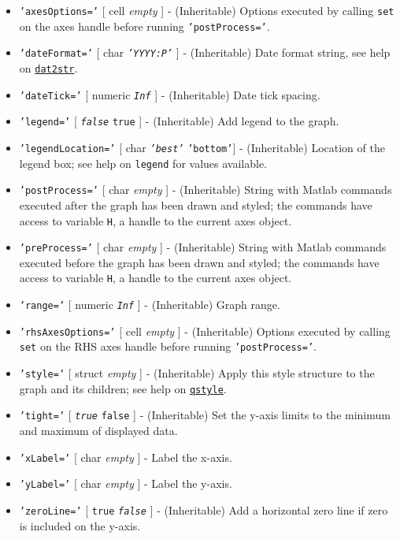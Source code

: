  \begin{itemize}
 \item
   \texttt{'axesOptions='} {[} cell \textbar{} \emph{empty} {]} -
   (Inheritable) Options executed by calling \texttt{set} on the axes
   handle before running \texttt{'postProcess='}.
 \item
   \texttt{'dateFormat='} {[} char \textbar{} \emph{\texttt{'YYYY:P'}}
   {]} - (Inheritable) Date format string, see help on
   \href{dates/dat2str}{\texttt{dat2str}}.
 \item
   \texttt{'dateTick='} {[} numeric \textbar{} \emph{\texttt{Inf}} {]} -
   (Inheritable) Date tick spacing.
 \item
   \texttt{'legend='} {[} \emph{\texttt{false}} \textbar{} \texttt{true}
   {]} - (Inheritable) Add legend to the graph.
 \item
   \texttt{'legendLocation='} {[} char \textbar{} \emph{\texttt{'best'}}
   \textbar{} \texttt{'bottom'}{]} - (Inheritable) Location of the legend
   box; see help on \texttt{legend} for values available.
 \item
   \texttt{'postProcess='} {[} char \textbar{} \emph{empty} {]} -
   (Inheritable) String with Matlab commands executed after the graph has
   been drawn and styled; the commands have access to variable
   \texttt{H}, a handle to the current axes object.
 \item
   \texttt{'preProcess='} {[} char \textbar{} \emph{empty} {]} -
   (Inheritable) String with Matlab commands executed before the graph
   has been drawn and styled; the commands have access to variable
   \texttt{H}, a handle to the current axes object.
 \item
   \texttt{'range='} {[} numeric \textbar{} \emph{\texttt{Inf}} {]} -
   (Inheritable) Graph range.
 \item
   \texttt{'rhsAxesOptions='} {[} cell \textbar{} \emph{empty} {]} -
   (Inheritable) Options executed by calling \texttt{set} on the RHS axes
   handle before running \texttt{'postProcess='}.
 \item
   \texttt{'style='} {[} struct \textbar{} \emph{empty} {]} -
   (Inheritable) Apply this style structure to the graph and its
   children; see help on \href{qreport/qstyle}{\texttt{qstyle}}.
 \item
   \texttt{'tight='} {[} \emph{\texttt{true}} \textbar{} \texttt{false}
   {]} - (Inheritable) Set the y-axis limits to the minimum and maximum
   of displayed data.
 \item
   \texttt{'xLabel='} {[} char \textbar{} \emph{empty} {]} - Label the
   x-axis.
 \item
   \texttt{'yLabel='} {[} char \textbar{} \emph{empty} {]} - Label the
   y-axis.
 \item
   \texttt{'zeroLine='} {[} \texttt{true} \textbar{}
   \emph{\texttt{false}} {]} - (Inheritable) Add a horizontal zero line
   if zero is included on the y-axis.
 \end{itemize}
 
